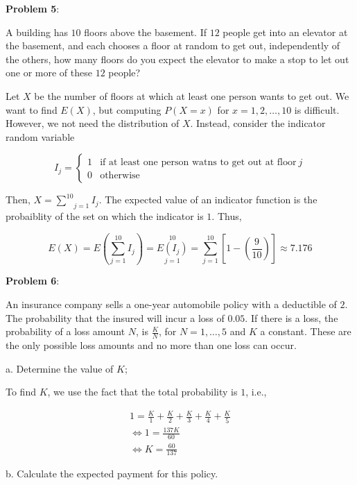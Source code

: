 \documentclass{article}
\begin{document}
\noindent\textbf{Problem 5}:

{\color{blue}

A building has $10$ floors above the basement. If $12$ people get into an elevator at the basement, and each chooses a floor at random to get out, independently of the others, how many floors do you expect the elevator to make a stop to let out one or more of these $12$ people?

Let $X$ be the number of floors at which at least one person wants to get out. We want to find $E(X)$, but computing $P(X=x)$ for $x=1,2,\ldots,10$ is difficult. However, we not need the distribution of $X$. Instead, consider the indicator random variable

$$I_j=\begin{cases}1&\text{if at least one person watns to get out at floor}\ j\\0&\text{otherwise}\end{cases}$$

Then, $X=\underset{j=1}{\overset{10}{\sum}}I_j$. The expected value of an indicator function is the probaiblity of the set on which the indicator is $1$. Thus,

$$E(X)=E(\underset{j=1}{\overset{10}{\sum}}I_j)=\underset{j=1}{\overset{10}{E(I_j)}}=\underset{j=1}{\overset{10}{\sum}}\left[1-\left(\frac{9}{10}\right)\right]\approx7.176$$

}

\noindent\textbf{Problem 6}:

An insurance company sells a one-year automobile policy with a deductible of $2$. The probability that the insured will incur a loss of $0.05$. If there is a loss, the probability of a loss amount $N$, is $\frac{K}{N}$, for $N=1,\ldots,5$ and $K$ a constant. These are the only possible loss amounts and no more than one loss can occur.

\indent\indent a. Determine the value of $K$;

{\color{blue}

To find $K$, we use the fact that the total probability is $1$, i.e.,

\begin{gather*}
    1=\frac{K}{1}+\frac{K}{2}+\frac{K}{3}+\frac{K}{4}+\frac{K}{5}\\
    \Leftrightarrow1=\frac{137K}{60}\\
    \Leftrightarrow K=\frac{60}{137}
\end{gather*}

}

\indent\indent b. Calculate the expected payment for this policy.
\end{document}
